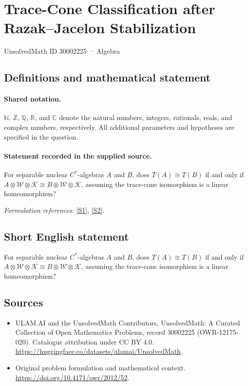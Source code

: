 \documentclass[11pt]{article}
\newcommand{\sref}[2]{\hyperlink{source:#1:#2}{[S#2]}}
\begin{document}
\setcounter{section}{30002224}
\section{Trace-Cone Classification after Razak–Jacelon Stabilization}\label{30002225}
{\small UnsolvedMath ID 30002225 · Algebra}
\subsection{Definitions and mathematical statement}

\paragraph{Shared notation.}$\mathbb N$, $\mathbb Z$, $\mathbb Q$, $\mathbb R$, and $\mathbb C$ denote the natural numbers, integers, rationals, reals, and complex numbers, respectively. All additional parameters and hypotheses are specified in the question.


\paragraph{Statement recorded in the supplied source.}
For separable nuclear $C^*$-algebras $A$ and $B$, does $T(A)\cong T(B)$ if and only if $A\otimes\mathcal W\otimes\mathcal K\cong B\otimes\mathcal W\otimes\mathcal K$, assuming the trace-cone isomorphism is a linear homeomorphism?
\par\smallskip\textit{Formulation references:} \sref{30002225}{1}, \sref{30002225}{2}.
\subsection{Short English statement}
For separable nuclear $C^*$-algebras $A$ and $B$, does $T(A)\cong T(B)$ if and only if $A\otimes\mathcal W\otimes\mathcal K\cong B\otimes\mathcal W\otimes\mathcal K$, assuming the trace-cone isomorphism is a linear homeomorphism?
\subsection{Sources}
\begin{itemize}
\item[\hypertarget{source:30002225:1}{S1}] ULAM.AI and the UnsolvedMath Contributors, UnsolvedMath: A Curated Collection of Open Mathematics Problems, record 30002225 (OWR-12175-020). Catalogue attribution under CC BY 4.0.
\url{https://huggingface.co/datasets/ulamai/UnsolvedMath}.
\item[\hypertarget{source:30002225:2}{S2}] Original problem formulation and mathematical context.
\url{https://doi.org/10.4171/owr/2012/52}.
\end{itemize}
\label{end:30002225}
\end{document}
